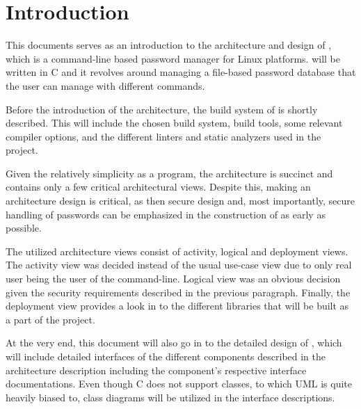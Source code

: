 \section{Introduction}

This documents serves as an introduction to the architecture and design of
\pman, which is a command-line based password manager for Linux
platforms. \pman will be written in C and it revolves around managing a
file-based password database that the user can manage with different commands.

Before the introduction of the architecture, the build system of \pman
is shortly described. This will include the chosen build system, build tools,
some relevant compiler options, and the different linters and static analyzers
used in the project.

Given the relatively simplicity \pman as a program, the architecture
is succinct and contains only a few critical architectural views. Despite this,
making an architecture design is critical, as then secure design and, most
importantly, secure handling of passwords can be emphasized in the construction
of \pman as early as possible.

The utilized architecture views consist of activity, logical and deployment views.
The activity view was decided instead of the usual use-case view due to only real
user being the user of the command-line. Logical view was an obvious decision given
the security requirements described in the previous paragraph. Finally, the
deployment view provides a look in to the different libraries that will be
built as a part of the \pman project.

At the very end, this document will also go in to the detailed design of
\pman, which will include detailed interfaces of the different components
described in the architecture description including the component's respective
interface documentations. Even though C does not support classes, to which UML
is quite heavily biased to, class diagrams will be utilized in the interface
descriptions.
